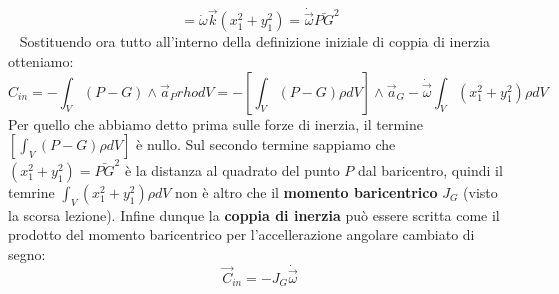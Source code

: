\[
    = \dot{\omega} \vec{k} (x_1^2 + y_1^2) = \dot{\vec{\omega}} \bar{PG}^2
\]
\ \newline
Sostituendo ora tutto all'interno della definizione iniziale di coppia di inerzia otteniamo:
\[
    C_{in} = - \int_V (P-G) \land \vec{a}_P rho dV = - \left[\int_V (P-G) \rho dV\right] \land \vec{a}_G - \dot{\vec{\omega}} \int_V (x_1^2 + y_1^2) \rho dV 
\]
Per quello che abbiamo detto prima sulle forze di inerzia, il termine $\left[\int_V (P-G) \rho dV\right]$ è nullo.\newline
Sul secondo termine sappiamo che $(x_1^2 + y_1^2) = \bar{PG}^2$ è la distanza al quadrato del punto $P$ dal baricentro, quindi il temrine $\int_V (x_1^2 + y_1^2) \rho dV $ non è altro che il \textbf{momento baricentrico} $J_G$ (visto la scorsa lezione).\newline
\newline
Infine dunque la \textbf{coppia di inerzia} può essere scritta come il prodotto del momento baricentrico per l'accellerazione angolare cambiato di segno:
\[
    \vec{C}_{in} = - J_G \dot{\vec{\omega}}
\]
